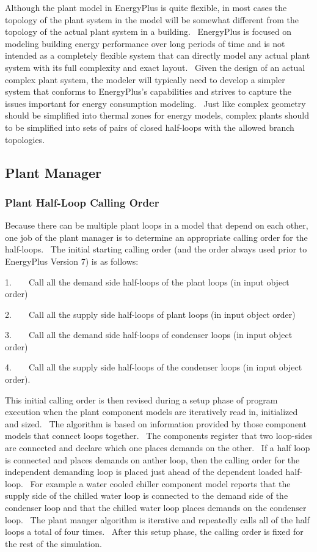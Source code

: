 Although the plant model in EnergyPlus is quite flexible, in most cases the topology of the plant system in the model will be somewhat different from the topology of the actual plant system in a building.~ EnergyPlus is focused on modeling building energy performance over long periods of time and is not intended as a completely flexible system that can directly model any actual plant system with its full complexity and exact layout.~ Given the design of an actual complex plant system, the modeler will typically need to develop a simpler system that conforms to EnergyPlus's capabilities and strives to capture the issues important for energy consumption modeling.~ Just like complex geometry should be simplified into thermal zones for energy models, complex plants should to be simplified into sets of pairs of closed half-loops with the allowed branch topologies.

\subsection{Plant Manager}\label{plant-manager}

\subsubsection{Plant Half-Loop Calling Order}\label{plant-half-loop-calling-order}

Because there can be multiple plant loops in a model that depend on each other, one job of the plant manager is to determine an appropriate calling order for the half-loops.~ The initial starting calling order (and the order always used prior to EnergyPlus Version 7) is as follows:

1.~~~~Call all the demand side half-loops of the plant loops (in input object order)

2.~~~~Call all the supply side half-loops of plant loops (in input object order)

3.~~~~Call all the demand side half-loops of condenser loops (in input object order)

4.~~~~Call all the supply side half-loops of the condenser loops (in input object order).

This initial calling order is then revised during a setup phase of program execution when the plant component models are iteratively read in, initialized and sized.~ The algorithm is based on information provided by those component models that connect loops together.~ The components register that two loop-sides are connected and declare which one places demands on the other.~ If a half loop is connected and places demands on anther loop, then the calling order for the independent demanding loop is placed just ahead of the dependent loaded half-loop.~ For example a water cooled chiller component model reports that the supply side of the chilled water loop is connected to the demand side of the condenser loop and that the chilled water loop places demands on the condenser loop.~ The plant manger algorithm is iterative and repeatedly calls all of the half loops a total of four times.~ After this setup phase, the calling order is fixed for the rest of the simulation.

